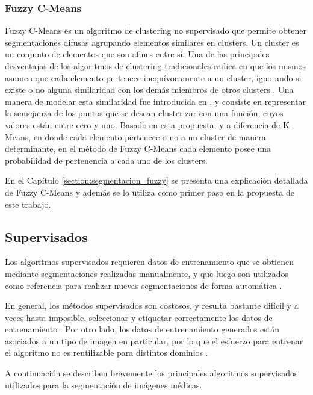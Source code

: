 \subsubsection{Fuzzy C-Means}
Fuzzy C-Means es un algoritmo de clustering no supervisado que permite obtener segmentaciones difusas agrupando elementos similares en clusters. Un cluster es un conjunto de elementos que son afines entre sí. Una de las principales desventajas de los algoritmos de clustering tradicionales radica en que los mismos asumen que cada elemento pertenece inequívocamente a un cluster, ignorando si existe o no alguna similaridad con los demás miembros de otros clusters \citep{full1982fuzzy}. Una manera de modelar esta similaridad fue introducida en \citep{zadeh1965fuzzy}, y consiste en representar la semejanza de los puntos que se desean clusterizar con una función, cuyos valores están entre cero y uno. Basado en esta propuesta, y a diferencia de K-Means, en donde cada elemento pertenece o no a un cluster de manera determinante, en el método de Fuzzy C-Means cada elemento posee una probabilidad de pertenencia a cada uno de los clusters.

En el Capítulo \ref{section:segmentacion_fuzzy} se presenta una explicación detallada de Fuzzy C-Means y además se lo utiliza como primer paso en la propuesta de este trabajo.

\subsection{Supervisados}
Los algoritmos supervisados requieren datos de entrenamiento que se obtienen mediante segmentaciones realizadas manualmente, y que luego son utilizados como referencia para realizar nuevas segmentaciones de forma automática \citep{pham2000current}.

En general, los métodos supervisados son costosos, y resulta bastante difícil y a veces hasta imposible, seleccionar y etiquetar correctamente los datos de entrenamiento \citep{jain2000statistical}. Por otro lado, los datos de entrenamiento generados están asociados a un tipo de imagen en particular, por lo que el esfuerzo para entrenar el algoritmo no es reutilizable para distintos dominios \citep{sharma2010automated}.

A continuación se describen brevemente los principales algoritmos supervisados utilizados para la segmentación de imágenes médicas.

